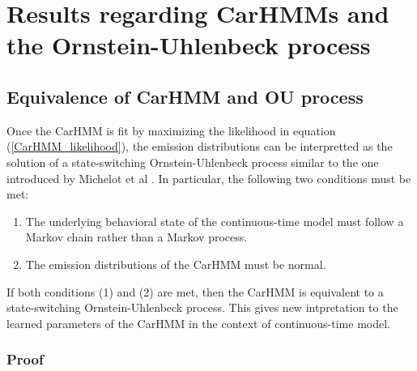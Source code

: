 
\section{Results regarding CarHMMs and the Ornstein-Uhlenbeck process}

\subsection{Equivalence of CarHMM and OU process}

Once the CarHMM is fit by maximizing the likelihood in equation (\ref{CarHMM_likelihood}), the emission distributions can be interpretted as the solution of a state-switching Ornstein-Uhlenbeck process similar to the one introduced by Michelot et al \cite{Michelot:2019}. In particular, the following two conditions must be met:
\begin{enumerate}
	\item The underlying behavioral state of the continuous-time model must follow a Markov chain rather than a Markov process.
	\item The emission distributions of the CarHMM must be normal.
\end{enumerate}
If both conditions (1) and (2) are met, then the CarHMM is equivalent to a state-switching Ornstein-Uhlenbeck process. This gives new intpretation to the learned parameters of the CarHMM in the context of continuous-time model.

\subsubsection{Proof}

